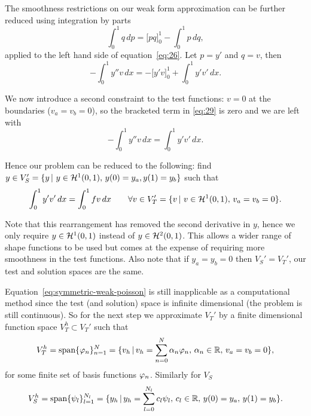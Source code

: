 The smoothness restrictions on our weak form approximation can be further reduced using integration by parts
\begin{equation*}
  \int_{0}^{1}q\, dp=\Big[pq\Big]_{0}^{1}-\int_{0}^{1}p\, dq,
\end{equation*}
applied to the left hand side of equation~\eqref{eq:26}. Let $p=y'$ and $q=v$, then
\begin{equation}
  -\int_{0}^{1}y''v\, dx=-\Big[y'v\Big]_{0}^{1}+\int_{0}^{1}y'v'\, dx.
  \label{eq:29}
\end{equation}

We now introduce a second constraint to the test functions: $v=0$
at the boundaries (\ie $v_a=v_b=0$), so the bracketed term in \eqref{eq:29} is
zero and we are left with
\begin{equation*}
  -\int_{0}^{1}y''v\, dx=\int_{0}^{1}y'v'\, dx.
\end{equation*}

Hence our problem can be reduced to the following: find $y\in V_{S}'=\{y \,|\, \, y \in \mathcal{H}^1(0,1),\, y(0) = y_a, y(1) = y_b \}$
such that
\begin{equation}
  \int_{0}^{1}y'v'\, dx=\int_{0}^{1}fv\, dx\qquad\forall v\in V'_{T}=\{v \,|\, \, v \in \mathcal{H}^1(0,1),\, v_a=v_b=0\}.\label{eq:symmetric-weak-poisson}
\end{equation}

Note that this rearrangement has removed the second derivative in $y$, hence we only require $y \in \mathcal{H}^1(0,1)$ instead of $y \in \mathcal{H}^2(0,1)$. This allows a wider range of shape
functions to be used but comes at the expense of requiring more smoothness in
the test functions. Also note that if $y_a = y_b = 0$ then $V_{S}'=V_{T}'$, our
test and solution spaces are the same.

Equation~\eqref{eq:symmetric-weak-poisson} is still inapplicable as a
computational method since the test (and solution) space is infinite dimensional
(\ie the problem is still continuous). So for the next step we approximate
$V_{T}'$ by a finite dimensional function space $V_{T}^{h}\subset V_{T}'$ such
that
\begin{equation}
  V_{T}^{h}=\text{span} \{ \varphi_{n} \}_{n=1}^{N}
  =  \{v_h \,|\, v_h = \sum_{n=0}^{N}\alpha_{n} \varphi_{n},\, \alpha_{n} \in \mathbb{R},\, v_a = v_b =0 \},
  \label{eq:30}
\end{equation}
for some finite set of basis functions $\varphi_{n}$. Similarly for $V_S$
\begin{equation}
  \label{eq:34}
    V_{S}^{h}=\text{span} \{ \psi_{l} \}_{l=1}^{N_l}
    =  \{y_h \,|\, y_h = \sum_{l=0}^{N_l}c_{l} \psi_{l},\,
    c_{l} \in \mathbb{R},\, y(0) = y_a,\, y(1) = y_b \}.
\end{equation}

